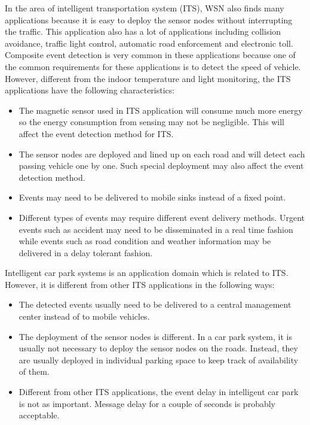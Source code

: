 In the area of intelligent transportation system (ITS), WSN also finds many applications because it is easy to deploy the sensor nodes without interrupting the traffic. This application also has a lot of applications including collision avoidance, traffic light control, automatic road enforcement and electronic toll. Composite event detection is very common in these applications because one of the common requirements for these applications is to detect the speed of vehicle. However, different from the indoor temperature and light monitoring, the ITS applications have the following characteristics:
\begin{itemize}
\item The magnetic sensor used in ITS application will consume much more energy so the energy consumption from sensing may not be negligible. This will affect the event detection method for ITS.
\item The sensor nodes are deployed and lined up on each road and will detect each passing vehicle one by one. Such special deployment may also affect the event detection method.
\item Events may need to be delivered to mobile sinks instead of a fixed point.
\item Different types of events may require different event delivery methods. Urgent events such as accident may need to be disseminated in a real time fashion while events such as road condition and weather information may be delivered in a delay tolerant fashion.
\end{itemize}

Intelligent car park systems is an application domain which is related to ITS. However, it is different from other ITS applications in the following ways:
\begin{itemize}
\item The detected events usually need to be delivered to a central management center instead of to mobile vehicles.
\item The deployment of the sensor nodes is different. In a car park system, it is usually not necessary to deploy the sensor nodes on the roads. Instead, they are usually deployed in individual parking space to keep track of availability of them.
\item Different from other ITS applications, the event delay in intelligent car park is not as important. Message delay for a couple of seconds is probably acceptable.
\end{itemize}

